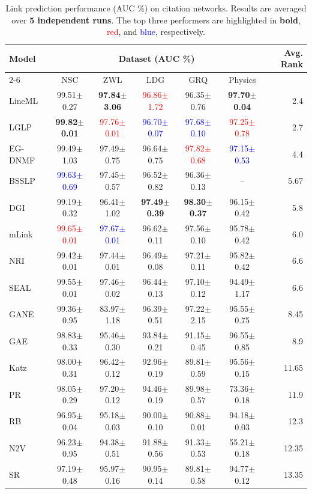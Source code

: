 \documentclass[pdflatex,sn-mathphys-num]{sn-jnl}%
\theoremstyle{thmstyleone}%
\theoremstyle{thmstyletwo}%
\theoremstyle{thmstylethree}%
\theoremstyle{plain} %
\theoremstyle{definition} %
\theoremstyle{remark} %
\theoremstyle{plain} %
\begin{document}
\begin{table}[ht!]
\centering
\caption{Link prediction performance (AUC \%) on citation networks. Results are averaged over \textbf{5 independent runs}. The top three performers are highlighted in \textbf{bold}, \textcolor{red}{red}, and \textcolor{blue}{blue}, respectively.}
\label{tab:citation_results_stacked}
\renewcommand{\arraystretch}{1.0}
\setlength{\tabcolsep}{3.5pt}
\small

\begin{tabular}{@{}lcccccr@{}}
\toprule

\multirow{2}{*}{Model} & \multicolumn{5}{c}{Dataset (AUC \%)} & \multirow{2}{*}{Avg. Rank} \\
\cmidrule(lr){2-6}
& NSC & ZWL & LDG & GRQ & Physics & \\
\midrule
LineML  & 99.51$\pm$0.27 & \textbf{97.84$\pm$3.06} & \textcolor{red}{96.86$\pm$1.72} & 96.35$\pm$0.76 & \textbf{97.70$\pm$0.04} & 2.4 \\
LGLP    & \textbf{99.82$\pm$0.01} & \textcolor{red}{97.76$\pm$0.01} & \textcolor{blue}{96.70$\pm$0.07} & \textcolor{blue}{97.68$\pm$0.10} & \textcolor{red}{97.25$\pm$0.78} & 2.7 \\
EG-DNMF    & 99.49$\pm$1.03 & 97.49$\pm$0.75 & 96.64$\pm$0.75 & \textcolor{red}{97.82$\pm$0.68} & \textcolor{blue}{97.15$\pm$0.53} & 4.4 \\
BSSLP   & \textcolor{blue}{99.63$\pm$0.69} & 97.45$\pm$0.57 & 96.52$\pm$0.82 & 96.36$\pm$0.13 & -- & 5.67 \\
DGI     & 99.19$\pm$0.32 & 96.41$\pm$1.02 & \textbf{97.49$\pm$0.39} & \textbf{98.30$\pm$0.37} & 96.15$\pm$0.42 & 5.8 \\
mLink   & \textcolor{red}{99.65$\pm$0.01} & \textcolor{blue}{97.67$\pm$0.01} & 96.62$\pm$0.11 & 97.56$\pm$0.10 & 95.78$\pm$0.42 & 6.0 \\
NRI     & 99.42$\pm$0.01 & 97.44$\pm$0.01 & 96.49$\pm$0.08 & 97.21$\pm$0.11 & 95.82$\pm$0.42 & 6.6 \\
SEAL    & 99.55$\pm$0.01 & 97.46$\pm$0.02 & 96.44$\pm$0.13 & 97.10$\pm$0.12 & 94.49$\pm$1.17 & 6.6 \\
GANE    & 99.36$\pm$0.95 & 83.97$\pm$1.18 & 96.39$\pm$0.51 & 97.22$\pm$2.15 & 95.55$\pm$0.75 & 8.45 \\
GAE     & 98.83$\pm$0.33 & 95.46$\pm$0.30 & 93.84$\pm$0.21 & 91.15$\pm$0.45 & 96.55$\pm$0.85 & 8.9 \\
Katz    & 98.00$\pm$0.31 & 96.42$\pm$0.12 & 92.96$\pm$0.19 & 89.81$\pm$0.59 & 95.56$\pm$0.15 & 11.65 \\
PR      & 98.05$\pm$0.29 & 97.20$\pm$0.12 & 94.46$\pm$0.19 & 89.98$\pm$0.57 & 73.36$\pm$0.18 & 11.9 \\
RB      & 96.95$\pm$0.04 & 95.18$\pm$0.03 & 90.00$\pm$0.10 & 90.88$\pm$0.01 & 94.18$\pm$0.03 & 12.3 \\
N2V     & 96.23$\pm$0.95 & 94.38$\pm$0.51 & 91.88$\pm$0.56 & 91.33$\pm$0.53 & 55.21$\pm$0.18 & 12.35 \\
SR      & 97.19$\pm$0.48 & 95.97$\pm$0.16 & 90.95$\pm$0.14 & 89.81$\pm$0.58 & 94.77$\pm$0.12 & 13.35 \\
\midrule



\end{tabular}
\end{table}
\end{document}
